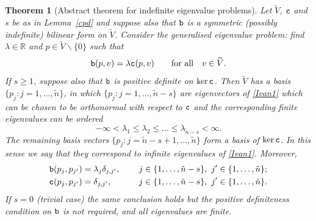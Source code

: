 \documentclass[numbers,webpdf,imaiai]{ima-authoring-template}%
\theoremstyle{thmstyletwo}%
\newtheorem{theorem}{Theorem}[section]
\numberwithin{equation}{section}
\newcommand{\txtb}{\textup{\texttt{b}}}
\newcommand{\txtc}{\textup{\texttt{c}}}
\newcommand{\wV}{\widetilde{V}}
\numberwithin{equation}{section}
\begin{document}
{\begin{theorem}[Abstract theorem for indefinite eigenvalue problems]
\label{lem_ind_ev}
Let $\wV$, $\txtc$ and $s$ be 
as in Lemma~\ref{cpd} and suppose also that $\txtb$ is a symmetric \textup{(}possibly indefinite\textup{)} bilinear form on $\wV$. 
Consider the generalised eigenvalue problem: find $\lambda \in \mathbb{R}$ and $p \in \wV \backslash \{0\}$ such that 
\begin{equation} \label{Ivan1}
  \txtb(p,v)  = \lambda \txtc(p,v) \qquad \text{for all} \quad v \in \wV.
\end{equation}
If $s \ge 1$, suppose also that $\txtb$ is positive definite on $\ker\txtc$. 
Then  $\wV$ has a basis $\{p_j: j = 1, \ldots,\tilde n\}$,  in which  $\{p_j: j = 1, \ldots, \tilde n-s\}$ are eigenvectors of \eqref{Ivan1}  which
can be chosen to be orthonormal with respect to $\txtc$ and the corresponding finite eigenvalues can be ordered
\begin{equation} \label{Ivan11}
	-\infty < \lambda_1 \leq  \lambda_2 \leq   \ldots \leq \lambda_{\tilde n-s} < \infty. 
\end{equation} 
The remaining  basis vectors $\{p_j: j = \tilde n-s+1, \ldots, \tilde n\}$  form a basis of $\ker\txtc$. 
In this sense we say that they correspond to infinite  eigenvalues of \eqref{Ivan1}.
Moreover, 
\begin{alignat}{2}
	\txtb(p_j,p_{j'}) &= \lambda_j \delta_{j,j'}, \quad && \ j \in \{1, \ldots, \tilde n-s\}, \ j'\in\{1,\ldots,\tilde n\};
	\label{orth_b}
	\\
	\txtc(p_j,p_{j'}) &= \delta_{j,j'}, \quad && \ j\in\{1,\ldots,\tilde n-s\},\ j'\in\{1,\ldots,\tilde n\}.
	\label{orth_c}
\end{alignat}
If $s=0$ (trivial case) the same conclusion holds but the positive definiteness condition on $\txtb$ is not required, 
and all eigenvalues are finite.
\end{theorem}

}
\end{document}
